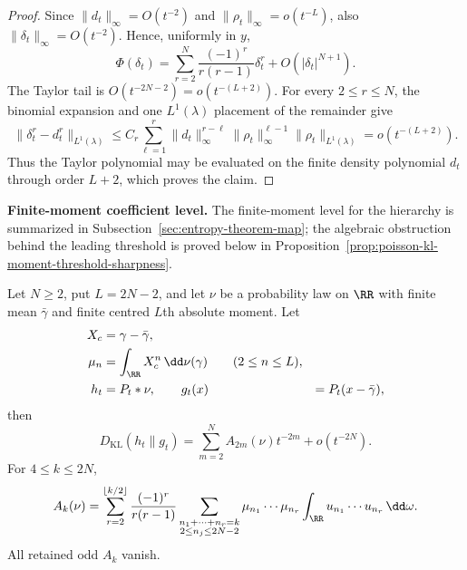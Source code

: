 \ifdefined\JFAArticleMain
{}
\else
\begin{proof}
Since \(\|d_t\|_\infty=O(t^{-2})\) and
\(\|\rho_t\|_\infty=o(t^{-L})\), also
\(\|\delta_t\|_\infty=O(t^{-2})\).  Hence, uniformly in \(y\),
\[
\Phi(\delta_t)=
\sum_{r=2}^{N}\frac{(-1)^r}{r(r-1)}\delta_t^r
+O(|\delta_t|^{N+1}).
\]
The Taylor tail is \(O(t^{-2N-2})=o(t^{-(L+2)})\).  For every
\(2\le r\le N\), the binomial expansion and one \(L^1(\lambda)\) placement
of the remainder give
\[
\|\delta_t^r-d_t^r\|_{L^1(\lambda)}
\le
C_r\sum_{\ell=1}^{r}
\|d_t\|_\infty^{r-\ell}
\|\rho_t\|_\infty^{\ell-1}
\|\rho_t\|_{L^1(\lambda)}
=o(t^{-(L+2)}).
\]
Thus the Taylor polynomial may be evaluated on the finite density polynomial
\(d_t\) through order \(L+2\), which proves the claim.
\end{proof}
\fi

\medskip
{}\label{par:coefficient-evaluability-scope}
\noindent\textbf{Finite-moment coefficient level.}
The finite-moment level for the hierarchy is summarized in
Subsection~\ref{sec:entropy-theorem-map}; the algebraic obstruction
behind the leading threshold is proved below in
Proposition~\ref{prop:poisson-kl-moment-threshold-sharpness}.
\medskip

\begin{theorem}%
\label{thm:poisson-kl-even-orders}
Let \(N\ge2\), put \(L=2N-2\), and let \(\nu\) be a probability law on
\(\RR\) with finite mean \(\bar{\gamma}\) and finite centred \(L\)th absolute
moment.  Let
\[
\begin{aligned}
X_c&=\gamma-\bar{\gamma},\\
\mu_n&=\int_{\RR} X_c^n\,\dd\nu(\gamma)\qquad(2\le n\le L),\\
h_t&=P_t*\nu,\qquad
g_t(x)&=P_t(x-\bar{\gamma}),
\end{aligned}
\]
then
\begin{equation}\label{eq:poisson-kl-even-orders}
D_{\mathrm{KL}}(h_t\|g_t)
=\sum_{m=2}^{N}A_{2m}(\nu)t^{-2m}+o(t^{-2N}).
\end{equation}
For \(4\le k\le2N\),
\begin{equation}\label{eq:coefficient-identification-transfer-expansion}
A_k(\nu)=
\sum_{r=2}^{\lfloor k/2\rfloor}
\frac{(-1)^r}{r(r-1)}
\sum_{\substack{n_1+\cdots+n_r=k\\2\le n_j\le2N-2}}
\mu_{n_1}\cdots\mu_{n_r}
\int_{\RR}u_{n_1}\cdots u_{n_r}\,\dd\omega .
\end{equation}
All retained odd \(A_k\) vanish.
\end{theorem}

